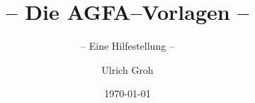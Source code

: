 \begin{titlepage}
\titlehead{Universität Tübingen \\ 
	Mathematisch-Naturwissenschaftliche Fakultät \\ 
	Fachbereich Mathematik}
\subject{-- \LaTeX --}
\title{-- Die AGFA--Vorlagen --}
\subtitle{-- Eine Hilfestellung --}
\author{Ulrich Groh}
\date{\today} 
\publishers{}
\end{titlepage}
\maketitle
\cleardoublepage